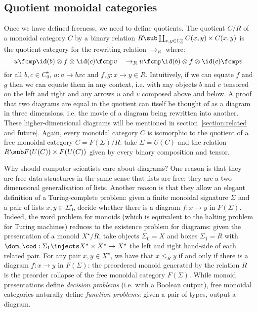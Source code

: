 \subsection{Quotient monoidal categories}

Once we have defined freeness, we need to define quotients.
The quotient $C / R$ of a monoidal category $C$ by a binary relation $R \sub \coprod_{x, y \in C_0^\star} C(x, y) \times C(x, y)$ is the quotient category for the rewriting relation $\to_R$ where:
$$u \fcmp \id(b) \otimes f \otimes \id(c) \fcmp v \quad
\to_R u \fcmp \id(b) \otimes f \otimes \id(c) \fcmp v$$
for all $b, c \in C_0^\star$, $u : a \to b x c$ and $f, g : x \to y \in R$.
Intuitively, if we can equate $f$ and $g$ then we can equate them in any context, i.e. with any objects $b$ and $c$ tensored on the left and right and any arrows $u$ and $v$ composed above and below.
A proof that two diagrams are equal in the quotient can itself be thought of as a diagram in three dimensions, i.e. the movie of a diagram being rewritten into another.
These higher-dimensional diagrams will be mentioned in section~\ref{section:related and future}.
Again, every monoidal category $C$ is isomorphic to the quotient of a free monoidal category $C = F(\Sigma) / R$: take $\Sigma = U(C)$ and the relation $R \sub F(U(C)) \times F(U(C))$ given by every binary composition and tensor.

Why should computer scientists care about diagrams?
One reason is that they are free data structures in the same sense that lists are free: they are a two-dimensional generalisation of lists.
Another reason is that they allow an elegant definition of a Turing-complete problem: given a finite monoidal signature $\Sigma$ and a pair of lists $x, y \in \Sigma_0^\star$, decide whether there is a diagram $f : x \to y$ in $F(\Sigma)$.
Indeed, the word problem for monoids (which is equivalent to the halting problem for Turing machines) reduces to the existence problem for diagrams: given the presentation of a monoid $X^\star / R$,
take objects $\Sigma_0 = X$ and boxes $\Sigma_1 = R$ with $\dom, \cod : \Sigma_1 \injects X^\star \times X^\star \to X^\star$ the left and right hand-side of each related pair.
For any pair $x, y \in X^\star$, we have that $x \leq_R y$ if and only if there is a diagram $f : x \to y$ in $F(\Sigma)$: the preordered monoid generated by the relation $R$ is the preorder collapse of the free monoidal category $F(\Sigma)$.
While monoid presentations define \emph{decision problems} (i.e. with a Boolean output), free monoidal categories naturally define \emph{function problems}: given a pair of types, output a diagram.

